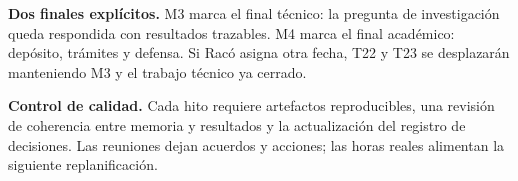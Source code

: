 \documentclass[10pt,a4paper]{article}
\begin{document}
\textbf{Dos finales explícitos.} M3 marca el final técnico: la pregunta de investigación queda respondida con resultados trazables. M4 marca el final académico: depósito, trámites y defensa. Si Racó asigna otra fecha, T22 y T23 se desplazarán manteniendo M3 y el trabajo técnico ya cerrado.

\textbf{Control de calidad.} Cada hito requiere artefactos reproducibles, una revisión de coherencia entre memoria y resultados y la actualización del registro de decisiones. Las reuniones dejan acuerdos y acciones; las horas reales alimentan la siguiente replanificación.
\end{document}
